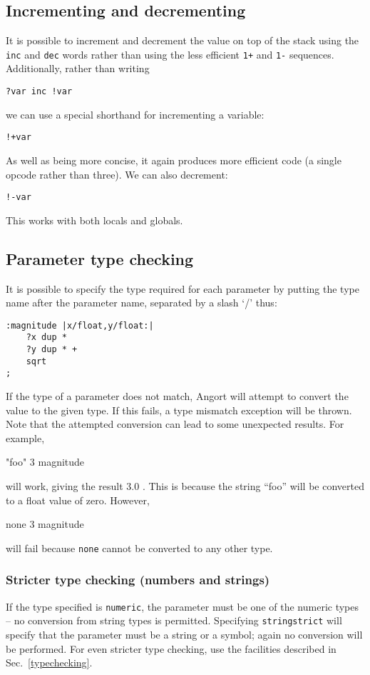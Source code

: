 \subsection{Incrementing and decrementing}
It is possible to increment and decrement the value on top of the stack
using the \texttt{inc} and \texttt{dec} words rather than using
the less efficient \texttt{1+} and \texttt{1-} sequences.
Additionally, rather than writing
\begin{lstlisting}
?var inc !var
\end{lstlisting}
we can use a special shorthand for incrementing a variable:
\begin{lstlisting}
!+var
\end{lstlisting}
As well as being more concise, it again produces more efficient code
(a single opcode rather than three). We can
also decrement:
\begin{lstlisting}
!-var
\end{lstlisting}
This works with both locals and globals.

\subsection{Parameter type checking}
It is possible to specify the type required for each parameter by putting the type name
after the parameter name, separated by a slash `/' thus:
\begin{lstlisting}
:magnitude |x/float,y/float:|
    ?x dup *
    ?y dup * +
    sqrt
;
\end{lstlisting}
If the type of a parameter does not match, Angort will attempt to convert the 
value to the given type. If this fails, a type mismatch exception will be thrown.
Note that the attempted conversion can lead to some unexpected results. For example,
\begin{v}
"foo" 3 magnitude
\end{v}
will work, giving the result 3.0 . This is because the string ``foo'' will be converted
to a float value of zero. However,
\begin{v}
none 3 magnitude
\end{v}
will fail because \texttt{none} cannot be converted to any other type.

\subsubsection{Stricter type checking (numbers and strings)}
If the type specified is \texttt{numeric}, the parameter
must be one of the numeric types -- no conversion from string types
is permitted. Specifying \texttt{stringstrict} will specify
that the parameter must be a string or a symbol; again no conversion
will be performed.
For even stricter type checking, use the facilities described in
Sec.~\ref{typechecking}.

